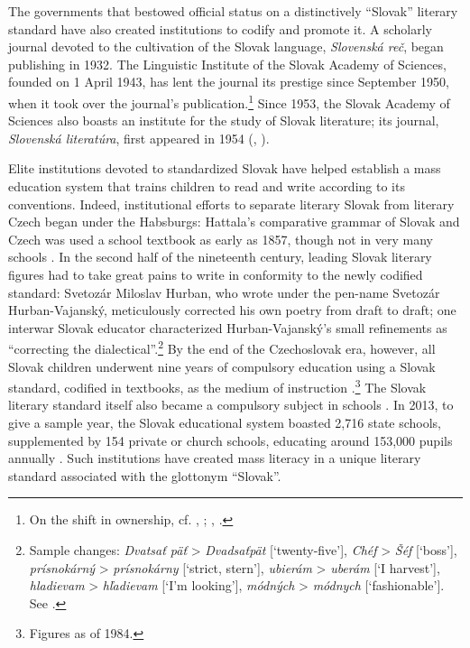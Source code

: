 The governments that bestowed official status on a distinctively “Slovak” literary standard have also created institutions to codify and promote it. A scholarly journal devoted to the cultivation of the Slovak language, \textit{Slovenská reč}, began publishing in 1932. The Linguistic Institute of the Slovak Academy of Sciences, founded on 1 April 1943, has lent the journal its prestige since September 1950, when it took over the journal’s publication.\footnote{On the shift in ownership, cf. , \citet[192]{anon_notitle_19491950}; , \citet[32]{anon_notitle_19501951}.} Since 1953, the Slovak Academy of Sciences also boasts an institute for the study of Slovak literature; its journal, \textit{Slovenská literatúra}, first appeared in 1954 (, \cite[3--4]{anon_uvodom_1954}).

Elite institutions devoted to standardized Slovak have helped establish a mass education system that trains children to read and write according to its conventions. Indeed, institutional efforts to separate literary Slovak from literary Czech began under the Habsburgs: Hattala’s comparative grammar of Slovak and Czech was used a school textbook as early as 1857, though not in very many schools \citep[507]{lindner_cechisches_1873}. In the second half of the nineteenth century, leading Slovak literary figures had to take great pains to write in conformity to the newly codified standard: Svetozár Miloslav Hurban, who wrote under the pen-name Svetozár Hurban-Vajanský, meticulously corrected his own poetry from draft to draft; one interwar Slovak educator characterized Hurban-Vajanský’s small refinements as “correcting the dialectical”.\footnote{Sample changes: \textit{Dvatsať päť} > \textit{Dvadsaťpät} [‘twenty-five’], \textit{Chéf} > \textit{Šéf} [‘boss’], \textit{prísnokárný} > \textit{prísnokárny} [‘strict, stern’], \textit{ubierám} > \textit{uberám} [‘I harvest’], \textit{hladievam} > \textit{hľadievam} [‘I’m looking’], \textit{módných} > \textit{módnych} [‘fashionable’]. See \citet[20]{krusinsky_prispevky_1928}.} By the end of the Czechoslovak era, however, all Slovak children underwent nine years of compulsory education using a Slovak standard, codified in textbooks, as the medium of instruction \citep[104, 106]{kopp_east_1992}.\footnote{Figures as of 1984.} The Slovak literary standard itself also became a compulsory subject in schools \citep[32]{pokrivcakova_clil_2013}. In 2013, to give a sample year, the Slovak educational system boasted 2,716 state schools, supplemented by 154 private or church schools, educating around 153,000 pupils annually \citep[46]{santiago_oecd_2016}. Such institutions have created mass literacy in a unique literary standard associated with the glottonym “Slovak”.

